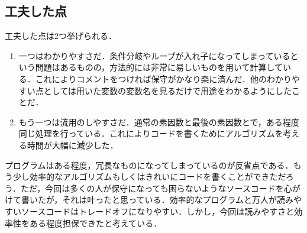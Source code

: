 \documentclass{jlreq}
\begin{document}
  \subsection*{工夫した点}
  工夫した点は2つ挙げられる．
  \begin{enumerate}[(1.)  ]
    \item 一つはわかりやすさだ．条件分岐やループが入れ子になってしまっているという問題はあるものの，方法的には非常に易しいものを用いて計算している．これによりコメントをつければ保守がかなり楽に済んだ．他のわかりやすい点としては用いた変数の変数名を見るだけで用途をわかるようにしたことだ．
    \item もう一つは流用のしやすさだ．通常の素因数と最後の素因数とで，ある程度同じ処理を行っている．これによりコードを書くためにアルゴリズムを考える時間が大幅に減少した．
  \end{enumerate}
  プログラムはある程度，冗長なものになってしまっているのが反省点である．もう少し効率的なアルゴリズムもしくはきれいにコードを書くことができただろう．ただ，今回は多くの人が保守になっても困らないようなソースコードを心がけて書いたが，それは叶ったと思っている．効率的なプログラムと万人が読みやすいソースコードはトレードオフになりやすい．しかし，今回は読みやすさと効率性をある程度担保できたと考えている．
\end{document}
